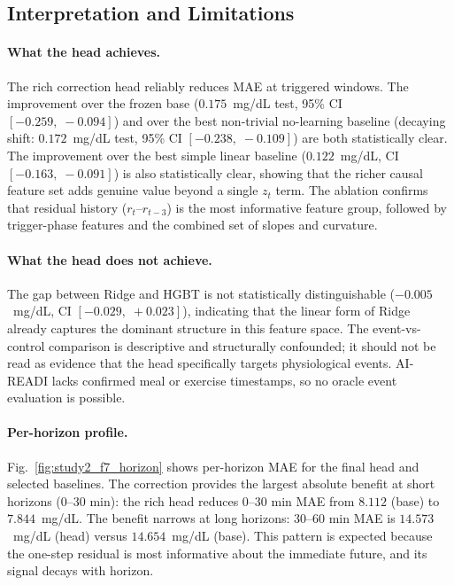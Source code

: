 \subsection{Interpretation and Limitations}
\label{subsec:study2_interp}

\paragraph{What the head achieves.}
The rich correction head reliably reduces MAE at triggered windows.
The improvement over the frozen base ($0.175$~mg/dL test, 95\% CI
$[-0.259,\;-0.094]$) and over the best non-trivial no-learning baseline
(decaying shift: $0.172$~mg/dL test, 95\% CI $[-0.238,\;-0.109]$)
are both statistically clear.
The improvement over the best simple linear baseline ($0.122$~mg/dL,
CI $[-0.163,\;-0.091]$) is also statistically clear, showing that the
richer causal feature set adds genuine value beyond a single $z_t$ term.
The ablation confirms that residual history ($r_t$--$r_{t-3}$) is the
most informative feature group, followed by trigger-phase features
and the combined set of slopes and curvature.

\paragraph{What the head does not achieve.}
The gap between Ridge and HGBT is not statistically distinguishable
($-0.005$~mg/dL, CI $[-0.029,\;+0.023]$), indicating that the linear
form of Ridge already captures the dominant structure in this feature space.
The event-vs-control comparison is descriptive and structurally confounded;
it should not be read as evidence that the head specifically targets
physiological events.
AI-READI lacks confirmed meal or exercise timestamps, so no oracle event
evaluation is possible.

\paragraph{Per-horizon profile.}
Fig.~\ref{fig:study2_f7_horizon} shows per-horizon MAE for the final
head and selected baselines.
The correction provides the largest absolute benefit at short horizons
(0--30 min): the rich head reduces 0--30 min MAE from
$8.112$ (base) to $7.844$~mg/dL.
The benefit narrows at long horizons: 30--60 min MAE is $14.573$~mg/dL
(head) versus $14.654$~mg/dL (base).
This pattern is expected because the one-step residual is most informative
about the immediate future, and its signal decays with horizon.

